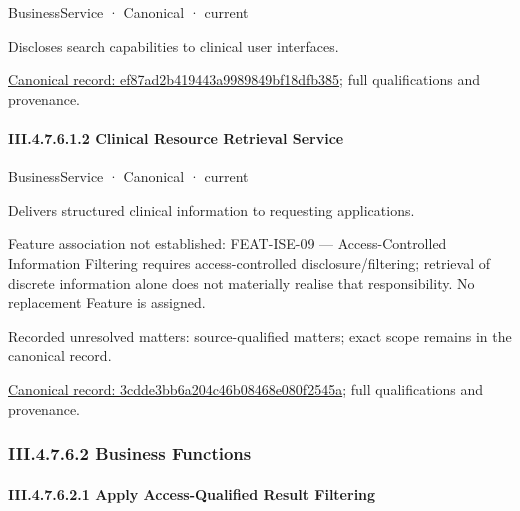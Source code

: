\label{element:ef87ad2b419443a9989849bf18dfb385}
{\small BusinessService · Canonical · current}\par

Discloses search capabilities to clinical user interfaces.


{\footnotesize \href{../../../../continuum/business/business-service/ef87ad2b419443a9989849bf18dfb385.md}{Canonical record: ef87ad2b419443a9989849bf18dfb385}; full qualifications and provenance.}\par
\paragraph*{III.4.7.6.1.2 Clinical Resource Retrieval Service}
\label{navigation:III.4.7.6.1.2}

\label{element:3cdde3bb6a204c46b08468e080f2545a}
{\small BusinessService · Canonical · current}\par

Delivers structured clinical information to requesting applications.



Feature association not established: FEAT-ISE-09 — Access-Controlled Information Filtering requires access-controlled disclosure/filtering; retrieval of discrete information alone does not materially realise that responsibility. No replacement Feature is assigned.


{\small Recorded unresolved matters: source-qualified matters; exact scope remains in the canonical record.}\par
{\footnotesize \href{../../../../continuum/business/business-service/3cdde3bb6a204c46b08468e080f2545a.md}{Canonical record: 3cdde3bb6a204c46b08468e080f2545a}; full qualifications and provenance.}\par
\subsubsection*{III.4.7.6.2 Business Functions}
\label{navigation:III.4.7.6.2}

\paragraph*{III.4.7.6.2.1 Apply Access-Qualified Result Filtering}
\label{navigation:III.4.7.6.2.1}

